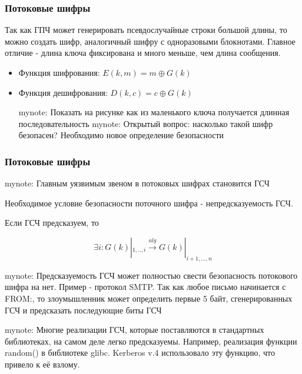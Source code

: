 \documentclass{beamer}
\newcommand{\mynote}[1]{mynote: #1}
\newcommand{\mynote}[1]{}
\begin{document}
\begin{frame}
  \frametitle{Потоковые шифры}

  Так как ГПЧ может генерировать псевдослучайные строки большой длины, то можно создать шифр,
  аналогичный шифру с одноразовыми блокнотами. Главное отличие - длина ключа фиксирована и много меньше, чем длина
  сообщения.

  \begin{itemize}
    \itemsep 2em
    \item{Функция шифрования: \newline
      $E(k,m)=m \oplus G(k)$}
    \item{Функция дешифрования: \newline
      $D(k,c)=c \oplus G(k)$}

    \mynote{Показать на рисунке как из маленького ключа получается длинная последовательность}
    \mynote{Открытый вопрос: насколько такой шифр безопасен? Необходимо новое определение безопасности}
  \end{itemize}

\end{frame}


\begin{frame}
  \frametitle{Потоковые шифры}

  \mynote{Главным уязвимым звеном в потоковых шифрах становится ГСЧ}

  Необходимое условие безопасности поточного шифра - непредсказуемость ГСЧ.

  \vspace{1em}

  Если ГСЧ предсказуем, то

  \[\exists i: G(k)|_{1,..,i} \stackrel{alg}{\longrightarrow} G(k)|_{i+1,...,n}\]

  \mynote{Предсказуемость ГСЧ может полностью свести безопасность потокового шифра на нет.
    Пример - протокол SMTP. Так как любое письмо начинается с FROM:, то злоумышленник может определить первые 5
    байт, сгенерированных ГСЧ и предсказать последующие биты ГСЧ}

  \mynote{Многие реализации ГСЧ, которые поставляются в стандартных библиотеках, на самом деле легко предсказуемы.
    Например, реализация функции random() в библиотеке glibc. Kerberos v.4 использовало эту функцию, что привело к её взлому.}

\end{frame}
\end{document}
